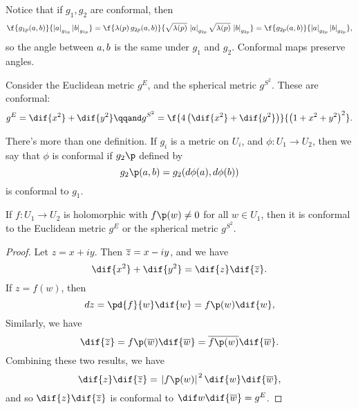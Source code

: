 Notice that if $g_1,g_2$ are conformal, then
\begin{equation*}
	\f{g_{1\pp}(\va,\vb)}{\left\vert \va \right\vert_{g_{1\pp}} \left\vert \vb \right\vert_{g_{1\pp}}}
	= \f{\lambda(\pp)\,g_{2\pp}(\va,\vb)}{ \sqrt{\lambda(\pp)}\, \left\vert \va \right\vert_{g_{2\pp}} \sqrt{\lambda(\pp)}\,\left\vert \vb \right\vert_{g_{2\pp}}}
	= \f{g_{2\pp}(\va,\vb)}{\left\vert \va \right\vert_{g_{2\pp}} \left\vert \vb \right\vert_{g_{2\pp}}},
\end{equation*}
so the angle between $a, b$ is the same under $g_1$ and $g_2$. Conformal maps preserve angles.

\begin{example}
	Consider the Euclidean metric $g^E$, and the spherical metric $g^{S^2}$. These are conformal:
	\begin{equation*}
		g^E = \dif{x^2} + \dif{y^2} \qqand
		g^{S^2} = \f{4\left( \dif{x^2} + \dif{y^2} \right)}{\left( 1+x^2+y^2 \right)^2}.
	\end{equation*}
\end{example}

There's more than one definition. If $g_i$ is a metric on $U_i$, and $\phi:U_1\to U_2$, then we say that $\phi$ is conformal if $g_2\p$ defined by
\begin{equation*}
	g_2\p(\va,\vb) = g_2(d\phi(\va), d\phi(\vb))
\end{equation*}
is conformal to $g_1$.


\begin{proposition}
	If $f:U_1\to U_2$ is holomorphic with $f\p(w)\neq 0$ for all $w\in U_1$, then it is conformal to the Euclidean metric $g^E$ or the spherical metric $g^{S^2}$.
\end{proposition}

\begin{proof}
	Let $z=x+iy$. Then $\overline{z}=x-iy$, and we have
	\begin{equation*}
		\dif{x^2} + \dif{y^2} = \dif{z} \dif{\zbar}.
	\end{equation*}
	If $z=f(w)$, then
	\begin{equation*}
		dz = \pd{f}{w} \dif{w} = f\p(w) \dif{w},
	\end{equation*}
	Similarly, we have
	\begin{equation*}
		\dif{\zbar} = f\p(\wbar) \dif{\wbar} = \overline{f\p(w)} \dif{\wbar}.
	\end{equation*}
	Combining these two results, we have
	\begin{equation*}
		\dif{z} \dif{\zbar} = \left.|f\p(w)|\right.^2 \dif{w} \dif{\wbar},
	\end{equation*}
	and so $\dif{z} \dif{\zbar}$ is conformal to $\dif w \dif{\wbar} = g^E$.
\end{proof}

